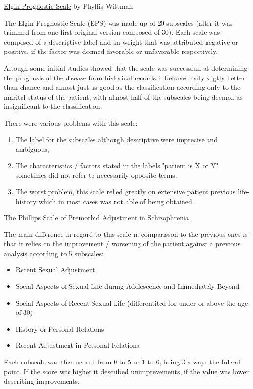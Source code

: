 \documentclass{Paper_Summary}
\begin{document}
\underline{Elgin  Prognostic  Scale} by Phyllis Wittman

    The Elgin Prognostic Scale (EPS) was made up of 20 subscales (after it was trimmed from one first original version composed of 30). Each scale was composed of a descriptive label and an weight that was attributed negative or positive, if the factor was deemed favorable or unfavorable respectively.

    Altough some initial studies showed that the scale was successfull at determining the prognosis of the disease from historical records it behaved only sligtly better than chance and almost just as good as the classification according only to the marital status of the patient, with almost half of the subscales being deemed as insignificant to the classification.

    There were various problems with this scale:
    \begin{enumerate}
        \item The label for the subscales although descriptive were imprecise and ambiguous,
        \item The characteristics / factors stated in the labels "patient is X or Y" sometimes did not refer to necessarily opposite terms.
        \item The worst problem, this scale relied greatly on extensive patient previous life-history which in most cases was not able of being obtained.
    \end{enumerate}

\underline{The Phillips Scale of Premorbid Adjustment in Schizophrenia}

    The main difference in regard to this scale in comparisson to the previous ones is that it relies on the improvement / worsening of the patient against a previous analysis according to 5 subscales:
    \begin{itemize}
        \item Recent Sexual Adjustment
        \item Social Aspects of Sexual Life during Adolescence and Immediately Beyond
        \item Social Aspects of Recent Sexual Life (differentited for under or above the age of 30)
        \item History or Personal Relations
        \item Recent Adjustment in Personal Relations
    \end{itemize}

    Each subscale was then scored from 0 to 5 or 1 to 6, being 3 always the fulcral point. If the score was higher it described unimprevements, if the value was lower describing improvements.
\end{document}

